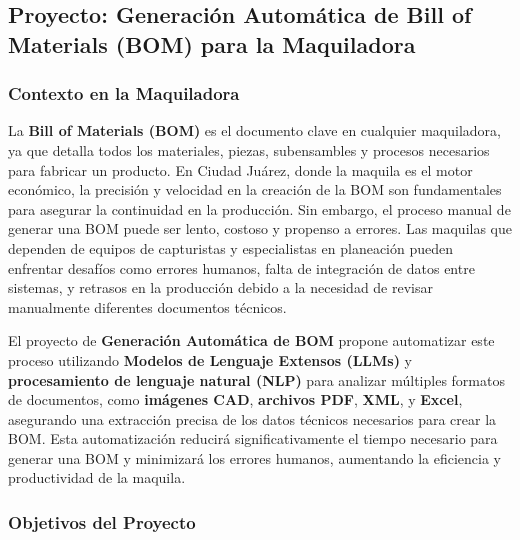 \documentclass[
  10pt,
  letterpaper,
]{book}
\begin{document}
\subsection{\texorpdfstring{Proyecto: \textbf{Generación Automática de
Bill of Materials (BOM)} para la
Maquiladora}{Proyecto: Generación Automática de Bill of Materials (BOM) para la Maquiladora}}\label{proyecto-generaciuxf3n-automuxe1tica-de-bill-of-materials-bom-para-la-maquiladora}

\subsubsection{Contexto en la
Maquiladora}\label{contexto-en-la-maquiladora}

La \textbf{Bill of Materials (BOM)} es el documento clave en cualquier
maquiladora, ya que detalla todos los materiales, piezas, subensambles y
procesos necesarios para fabricar un producto. En Ciudad Juárez, donde
la maquila es el motor económico, la precisión y velocidad en la
creación de la BOM son fundamentales para asegurar la continuidad en la
producción. Sin embargo, el proceso manual de generar una BOM puede ser
lento, costoso y propenso a errores. Las maquilas que dependen de
equipos de capturistas y especialistas en planeación pueden enfrentar
desafíos como errores humanos, falta de integración de datos entre
sistemas, y retrasos en la producción debido a la necesidad de revisar
manualmente diferentes documentos técnicos.

El proyecto de \textbf{Generación Automática de BOM} propone automatizar
este proceso utilizando \textbf{Modelos de Lenguaje Extensos (LLMs)} y
\textbf{procesamiento de lenguaje natural (NLP)} para analizar múltiples
formatos de documentos, como \textbf{imágenes CAD}, \textbf{archivos
PDF}, \textbf{XML}, y \textbf{Excel}, asegurando una extracción precisa
de los datos técnicos necesarios para crear la BOM. Esta automatización
reducirá significativamente el tiempo necesario para generar una BOM y
minimizará los errores humanos, aumentando la eficiencia y productividad
de la maquila.

\subsubsection{Objetivos del Proyecto}\label{objetivos-del-proyecto}
\end{document}
